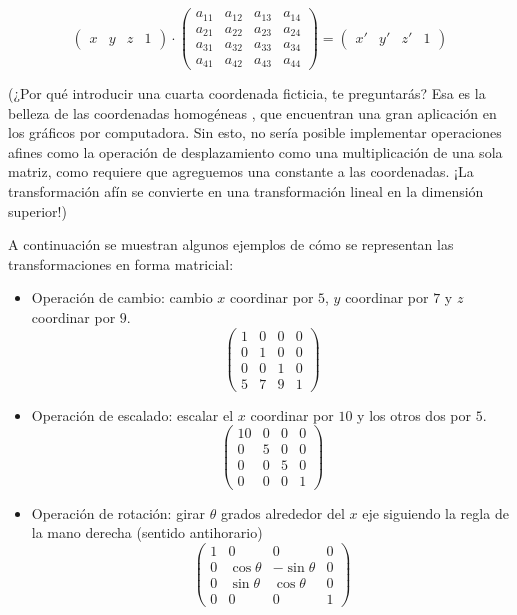 \begin{itemize}
$$\begin{pmatrix} x & y & z & 1 \end{pmatrix} \cdot
\begin{pmatrix}
	a_{11} & a_ {12} & a_ {13} & a_ {14} \\
	a_{21} & a_ {22} & a_ {23} & a_ {24} \\
	a_{31} & a_ {32} & a_ {33} & a_ {34} \\
	a_{41} & a_ {42} & a_ {43} & a_ {44}
\end{pmatrix}
= \begin{pmatrix} x' & y' & z' & 1 \end{pmatrix}$$

(¿Por qué introducir una cuarta coordenada ficticia, te preguntarás? Esa es la belleza de las coordenadas homogéneas , que encuentran una gran aplicación en los gráficos por computadora. Sin esto, no sería posible implementar operaciones afines como la operación de desplazamiento como una multiplicación de una sola matriz, como requiere que agreguemos una constante a las coordenadas. ¡La transformación afín se convierte en una transformación lineal en la dimensión superior!)

A continuación se muestran algunos ejemplos de cómo se representan las transformaciones en forma matricial:

\begin{itemize}
	\item Operación de cambio: cambio $x$ coordinar por $5$, $y$ coordinar por $7$ y $z$ coordinar por $9$.
$$\begin{pmatrix}
	1 & 0 & 0 & 0 \\
	0 & 1 & 0 & 0 \\
	0 & 0 & 1 & 0 \\
	5 & 7 & 9 & 1
\end{pmatrix}$$
	\item Operación de escalado: escalar el $x$ coordinar por $10$ y los otros dos por $5$.
$$\begin{pmatrix}
	10 & 0 & 0 & 0 \\
	0 & 5 & 0 & 0 \\
	0 & 0 & 5 & 0 \\
	0 & 0 & 0 & 1
\end{pmatrix}$$
	\item Operación de rotación: girar $\theta$ grados alrededor del $x$ eje siguiendo la regla de la mano derecha (sentido antihorario)
$$\begin{pmatrix}
	1 & 0 & 0 & 0 \\
	0 & \cos \theta & -\sin \theta & 0 \\
	0 & \sin \theta & \cos \theta & 0 \\
	0 & 0 & 0 & 1
\end{pmatrix}$$
\end{itemize}


\end{itemize}

